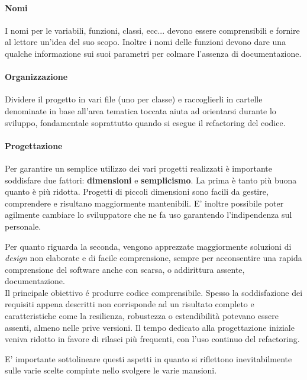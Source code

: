 \paragraph{Nomi}
I nomi per le variabili, funzioni, classi, ecc... devono essere comprensibili
e fornire al lettore un'idea del suo scopo. Inoltre i nomi delle funzioni
devono dare una qualche informazione sui suoi parametri per colmare l'assenza
di documentazione.

\paragraph{Organizzazione}
Dividere il progetto in vari file (uno per classe) e raccoglierli in cartelle
denominate in base all'area tematica toccata aiuta ad orientarsi durante lo
sviluppo, fondamentale soprattutto quando si esegue il \gls{refactoring} del
codice.

\paragraph{Progettazione}
Per garantire un semplice utilizzo dei vari progetti realizzati è importante
soddisfare due fattori: \textbf{dimensioni} e \textbf{semplicismo}.
La prima è tanto più buona quanto è più ridotta. Progetti di piccoli dimensioni
sono facili da gestire, comprendere e risultano maggiormente mantenibili. E'
inoltre possibile poter agilmente cambiare lo sviluppatore che ne fa uso
garantendo l'indipendenza sul personale.

Per quanto riguarda la seconda, vengono apprezzate maggiormente soluzioni di
\textit{design} non elaborate e di facile comprensione, sempre per acconsentire
una rapida comprensione del software anche con scarsa, o addirittura assente,
documentazione. \\

Il principale obiettivo é produrre codice comprensibile. Spesso la
soddisfazione dei requisiti appena descritti non corrisponde ad un risultato
completo e caratteristiche come la resilienza, robustezza o estendibilità
potevano essere assenti, almeno nelle prive versioni. Il tempo dedicato
alla progettazione iniziale veniva ridotto in favore di rilasci più frequenti,
con l'uso continuo del \gls{refactoring}.

E' importante sottolineare questi aspetti in quanto si riflettono
inevitabilmente sulle varie scelte compiute nello svolgere le varie mansioni.
